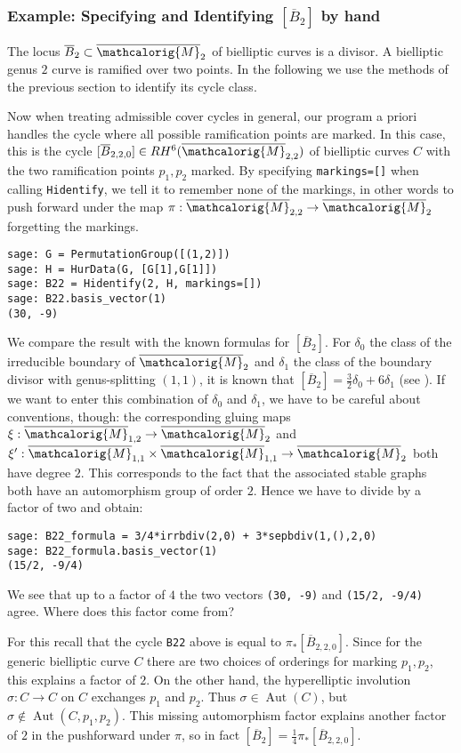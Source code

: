 \documentclass[11pt]{article}
\newcommand{\M}{\ensuremath{\overline{\mathcalorig{M}}}}
\begin{document}
\subsubsection{Example: Specifying and Identifying \texorpdfstring{$[\overline B_2]$}{[B 2]} by hand} \label{Sect:B2}
The locus $\overline B_2 \subset \M_{2}$ of bielliptic curves is a divisor. A bielliptic genus $2$ curve is ramified over two points. In the following we use the methods of the previous section to identify its cycle class.

Now when treating admissible cover cycles in general, our program a priori handles the cycle where all possible ramification points are marked. In this case, this is the cycle $[\overline B_{2,2,0}] \in RH^6(\M_{2,2})$ of bielliptic curves $C$ with the two ramification points $p_1, p_2$ marked. By specifying \verb|markings=[]| when calling \verb|Hidentify|, we tell it to remember none of the markings, in other words to push forward under the map $\pi: \M_{2,2} \to \M_2$ forgetting the markings.
\begin{lstlisting}
sage: G = PermutationGroup([(1,2)])
sage: H = HurData(G, [G[1],G[1]])
sage: B22 = Hidentify(2, H, markings=[])
sage: B22.basis_vector(1)
(30, -9)
\end{lstlisting}
We compare the result with the known formulas for $[\overline B_2]$. For $\delta_0$ the class of the irreducible boundary of $\M_2$ and $\delta_1$ the class of the boundary divisor with genus-splitting $(1,1)$, it is known that $[\overline B_2]=\frac{3}{2} \delta_0 + 6 \delta_1$ (see \cite{faberbiell}). If we want to enter this combination of $\delta_0$ and $\delta_1$, we have to be careful about conventions, though: the corresponding gluing maps $\xi: \M_{1,2} \to \M_{2}$ and $\xi':\M_{1,1} \times \M_{1,1} \to \M_2$ both have degree $2$. This corresponds to the fact that the associated stable graphs both have an automorphism group of order $2$. Hence we have to divide by a factor of two and obtain:
\begin{lstlisting}
sage: B22_formula = 3/4*irrbdiv(2,0) + 3*sepbdiv(1,(),2,0)
sage: B22_formula.basis_vector(1)
(15/2, -9/4)
\end{lstlisting}
We see that up to a factor of $4$ the two vectors \verb|(30, -9)| and \verb|(15/2, -9/4)| agree. Where does this factor come from?

For this recall that the cycle \verb|B22| above is equal to $\pi_* [\overline B_{2,2,0}]$. Since for the generic bielliptic curve $C$ there are two choices of orderings for marking $p_1, p_2$, this explains a factor of $2$. On the other hand, the hyperelliptic involution $\sigma: C \to C$ on $C$ exchanges $p_1$ and $p_2$. Thus $\sigma \in \operatorname{Aut}(C)$, but $\sigma \notin \operatorname{Aut}(C,p_1,p_2)$. This missing automorphism factor explains another factor of $2$ in the pushforward under $\pi$, so in fact $[\overline B_2] = \frac{1}{4} \pi_* [\overline B_{2,2,0}]$.
\end{document}
